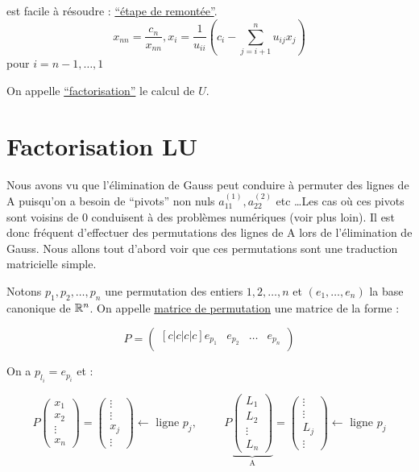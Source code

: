  est facile à résoudre : \underline{``étape de remontée''}.
\[
    x_{nn} = \frac{c_n}{x_{nn}}, x_i = \frac{1}{u_{ii}}(c_i - \sum_{j=i+1}^{n}u_{ij}x_j )
\] pour $i = n-1, \dots, 1$

\begin{remark}
    On appelle \underline{``factorisation''} le calcul de $U$.
\end{remark}









\section{Factorisation LU}
Nous avons vu que l'élimination de Gauss peut conduire à permuter des lignes de A puisqu'on a besoin de ``pivots'' non nuls $a_{11}^{(1)}, a_{22}^{(2)}$ etc \dots Les cas où ces pivots sont voisins de 0 conduisent à des problèmes numériques (voir plus loin). Il est donc fréquent d'effectuer des permutations des lignes de A lors de l'élimination de Gauss.
Nous allons tout d'abord voir que ces permutations sont une traduction matricielle simple.

Notons ${p_1,p_2,\dots,p_n}$ une permutation des entiers ${1,2,\dots,n}$ et $(e_1,\dots,e_n)$ la base canonique de $\mathbb{R}^n$. On appelle \underline{matrice de permutation} une matrice de la forme :

\[
    P =
    \begin{pmatrix}[c|c|c|c]
        e_{p_1} & e_{p_2} & \dots & e_{p_n}\\
\end{pmatrix} 
\]

On a $p_{l_i} = e_{p_i}$ et :

\[
    P
    \begin{pmatrix}
        x_1 \\ x_2 \\ \vdots \\ x_n
    \end{pmatrix}
    =
    \begin{pmatrix}
        \vdots \\ \vdots \\ x_j \\ \vdots
    \end{pmatrix}
    \text{$\leftarrow$ ligne $p_j$}, \hspace{1cm}
    P
    \underbrace{\begin{pmatrix}
        L_1 \\
        L_2 \\
        \vdots \\
        L_n
    \end{pmatrix}
    }_\text{A}
    =
    \begin{pmatrix}
        \vdots \\
        \vdots \\
        L_j \\ 
        \vdots
    \end{pmatrix}
    \text{$\leftarrow$ ligne $p_j$}
\]

